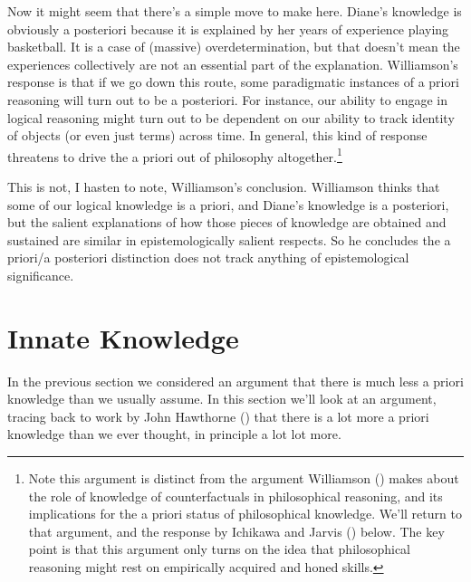 \documentclass[
  10pt,
  letterpaper,
  DIV=11,
  numbers=noendperiod,
  twoside]{scrartcl}
\begin{document}
Now it might seem that there's a simple move to make here. Diane's
knowledge is obviously a posteriori because it is explained by her years
of experience playing basketball. It is a case of (massive)
overdetermination, but that doesn't mean the experiences collectively
are not an essential part of the explanation. Williamson's response is
that if we go down this route, some paradigmatic instances of a priori
reasoning will turn out to be a posteriori. For instance, our ability to
engage in logical reasoning might turn out to be dependent on our
ability to track identity of objects (or even just terms) across time.
In general, this kind of response threatens to drive the a priori out of
philosophy altogether.\footnote{Note this argument is distinct from the
  argument Williamson ()
  makes about the role of knowledge of counterfactuals in philosophical
  reasoning, and its implications for the a priori status of
  philosophical knowledge. We'll return to that argument, and the
  response by Ichikawa and Jarvis
  () below. The key point is that
  this argument only turns on the idea that philosophical reasoning
  might rest on empirically acquired and honed skills.}

This is not, I hasten to note, Williamson's conclusion. Williamson
thinks that some of our logical knowledge is a priori, and Diane's
knowledge is a posteriori, but the salient explanations of how those
pieces of knowledge are obtained and sustained are similar in
epistemologically salient respects. So he concludes the a priori/a
posteriori distinction does not track anything of epistemological
significance.

\section{Innate Knowledge}\label{innateknowledge}

In the previous section we considered an argument that there is much
less a priori knowledge than we usually assume. In this section we'll
look at an argument, tracing back to work by John Hawthorne
() that there is a lot more a priori
knowledge than we ever thought, in principle a lot lot more.
\end{document}
